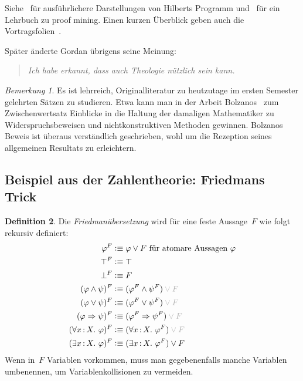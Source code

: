 \documentclass[a4paper,ngerman,12pt]{scrartcl}
\theoremstyle{definition}
\newtheorem{defn}{Definition}[section]
\theoremstyle{plain}
\theoremstyle{remark}
\newtheorem{bem}[defn]{Bemerkung}
\renewcommand{\_}{\mathpunct{.}\,}
\newcommand{\?}{\,{:}\,}
\newcommand{\defequiv}{\vcentcolon\equiv}
\begin{document}
Siehe~\cite{plato:hilbert,zach:hilbert,raatikainen:hilbert} für ausführlichere
Darstellungen von
Hilberts Programm und~\cite{kohlenbach:applprooftheory} für ein Lehrbuch zu
proof mining. Einen kurzen Überblick geben auch die
Vortragsfolien~\cite{avigad:proofmining}.

Später änderte Gordan übrigens seine Meinung:
\begin{quote}
\emph{Ich habe erkannt, dass auch Theologie nützlich sein kann.}
\end{quote}

\begin{bem}Es ist lehrreich, Originalliteratur zu heutzutage im ersten
Semester gelehrten Sätzen zu studieren. Etwa kann man in der Arbeit
Bolzanos~\cite{bolzano} zum Zwischenwertsatz Einblicke in die Haltung der
damaligen Mathematiker zu Widerspruchsbeweisen und nichtkonstruktiven Methoden
gewinnen. Bolzanos Beweis ist überaus verständlich geschrieben, wohl
um die Rezeption seines allgemeinen Resultats zu erleichtern.\end{bem}


\subsection{Beispiel aus der Zahlentheorie: Friedmans Trick}

\label{sect:friedman}%
\begin{defn}Die \emph{Friedmanübersetzung}
wird für eine feste Aussage~$F$ wie folgt rekursiv definiert:
\newcommand{\optF}{\textcolor{grey}{\phantom{}\vee F}}
\begin{align*}
  \varphi^F &\defequiv \varphi \vee F \text{ für atomare Aussagen~$\varphi$} \\
  \top^F &\defequiv \top \\
  \bot^F &\defequiv F \\
  (\varphi \wedge \psi)^F &\defequiv (\varphi^F \wedge \psi^F) \optF \\
  (\varphi \vee \psi)^F &\defequiv (\varphi^F \vee \psi^F) \optF \\
  (\varphi \Rightarrow \psi)^F &\defequiv (\varphi^F \Rightarrow \psi^F) \optF \\
  (\forall x\?X\_ \varphi)^F &\defequiv (\forall x\?X\_ \varphi^F) \optF \\
  (\exists x\?X\_ \varphi)^F &\defequiv (\exists x\?X\_ \varphi^F) \vee F
\end{align*}
Wenn in~$F$ Variablen vorkommen, muss man gegebenenfalls manche Variablen umbenennen, um
Variablenkollisionen zu vermeiden.
\end{defn}
\end{document}
